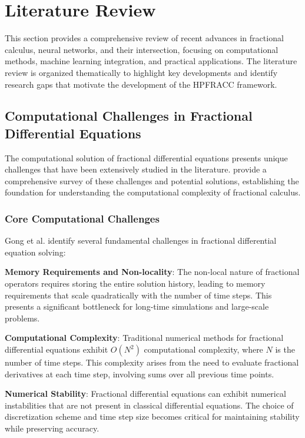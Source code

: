 \section{Literature Review}

This section provides a comprehensive review of recent advances in fractional calculus, neural networks, and their intersection, focusing on computational methods, machine learning integration, and practical applications. The literature review is organized thematically to highlight key developments and identify research gaps that motivate the development of the HPFRACC framework.

\subsection{Computational Challenges in Fractional Differential Equations}

The computational solution of fractional differential equations presents unique challenges that have been extensively studied in the literature. \citet{Gong2015ComputationalChallengeFDE} provide a comprehensive survey of these challenges and potential solutions, establishing the foundation for understanding the computational complexity of fractional calculus.

\subsubsection{Core Computational Challenges}

Gong et al. identify several fundamental challenges in fractional differential equation solving:

\textbf{Memory Requirements and Non-locality}: The non-local nature of fractional operators requires storing the entire solution history, leading to memory requirements that scale quadratically with the number of time steps. This presents a significant bottleneck for long-time simulations and large-scale problems.

\textbf{Computational Complexity}: Traditional numerical methods for fractional differential equations exhibit $O(N^2)$ computational complexity, where $N$ is the number of time steps. This complexity arises from the need to evaluate fractional derivatives at each time step, involving sums over all previous time points.

\textbf{Numerical Stability}: Fractional differential equations can exhibit numerical instabilities that are not present in classical differential equations. The choice of discretization scheme and time step size becomes critical for maintaining stability while preserving accuracy.

